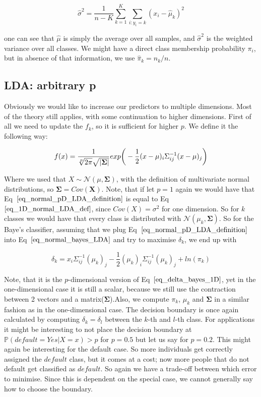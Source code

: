 \documentclass{article}
\begin{document}
\begin{equation}
    \hat{\sigma}^2 = \frac{1}{n-K} \sum_{k=1}^{K} \sum_{i:y_i=k} (x_i-\hat{\mu}_k)^2
\end{equation}

one can see that $\hat{\mu}$ is simply the average over all samples, and $\hat{\sigma}^2$ is the weighted variance over all classes. We might have a direct class membership probability $\pi_i$, but in absence of that information, we use $\hat{\pi}_k= n_k / n$.

\subsection{LDA: arbitrary p}

Obviously we would like to increase our predictors to multiple dimensions. Most of the theory still applies, with some continuation to higher dimensions.
First of all we need to update the $f_k$, so it is sufficient for higher $p$. We define it the following way:


\begin{equation}\label{eq_normal_pD_LDA_definition}
    f(x) = \frac{1}{\sqrt[p]{2\pi} \sqrt{|\mathbf{\Sigma}|}}exp \bigg{(} -\frac{1}{2} (x-\mu)_i \Sigma_{ij}^{-1} (x-\mu)_j  \bigg{)}
\end{equation}

Where we used that $X\sim \mathcal{N}(\mu,\mathbf{\Sigma})$, with the definition of multivariate normal distributions, so $\mathbf{\Sigma} = Cov(\mathbf{X})$. Note, that if let $p=1$ again we would have that Eq~$\ref{eq_normal_pD_LDA_definition}$ is equal to Eq~$\ref{eq_1D_normal_LDA_def}$, since $Cov(X) = \sigma ^ 2$ for one dimension. So for $k$ classes we would have that every class is distributed with $\mathcal{N}(\mu_k,\mathbf{\Sigma})$.
So for the Baye's classifier, assuming that we plug Eq~$\ref{eq_normal_pD_LDA_definition}$ into Eq~$\ref{eq_normal_bayes_LDA}$ and try to maximise $\delta_k$, we end up with 


\begin{equation}
    \delta_k = x_i \Sigma_{ij}^{-1} (\mu_{k})_j - \frac{1}{2} (\mu_{k})_i \Sigma_{ij}^{-1} (\mu_{k})_j + ln(\pi_k)
\end{equation}

Note, that it is the $p$-dimensional version of Eq~$\ref{eq_delta_bayes_1D}$, yet in the one-dimensional case it is still a scalar, because we still use the contraction between 2 vectors and a matrix($\mathbf{\Sigma}$).Also, we compute $\pi_k$, $\mu_k$ and $\mathbf{\Sigma}$ in a similar fashion as in the one-dimensional case. The decision boundary is once again calculated by computing $\delta_k = \delta_l$ between the $k$-th and $l$-th class. For applications it might be interesting to not place the decision boundary at $\mathbb{P}(default=Yes|X=x)>p$ for $p=0.5$ but let us say for $p=0.2$. This might again be interesting for the default case. So more individuals get correctly assigned the $default$ class, but it comes at a cost; now more people that do not default get classified as $default$. So again we have a trade-off between which error to minimise. Since this is dependent on the special case, we cannot generally say how to choose the boundary. \par
\end{document}

